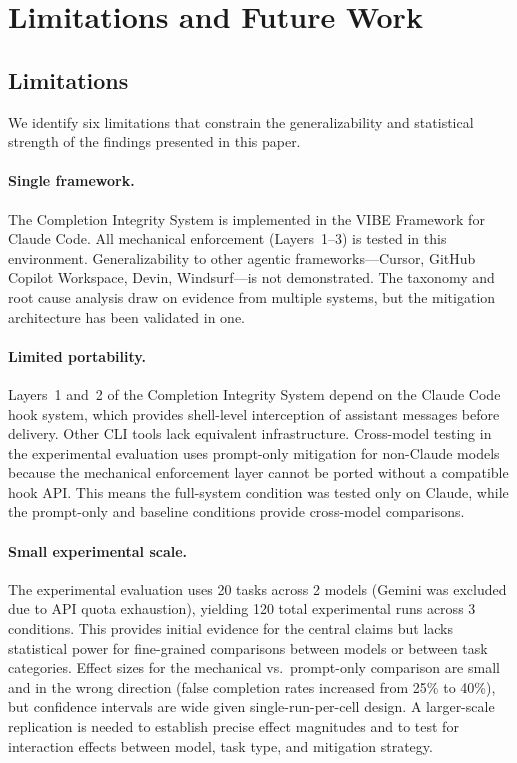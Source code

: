 \section{Limitations and Future Work}
\label{sec:limitations}


\subsection{Limitations}
\label{sec:limits}

We identify six limitations that constrain the generalizability and statistical strength of the findings presented in this paper.

\paragraph{Single framework.}
The Completion Integrity System is implemented in the VIBE Framework for Claude Code.
All mechanical enforcement (Layers~1--3) is tested in this environment.
Generalizability to other agentic frameworks---Cursor, GitHub Copilot Workspace, Devin, Windsurf---is not demonstrated.
The taxonomy and root cause analysis draw on evidence from multiple systems, but the mitigation architecture has been validated in one.

\paragraph{Limited portability.}
Layers~1 and~2 of the Completion Integrity System depend on the Claude Code hook system, which provides shell-level interception of assistant messages before delivery.
Other CLI tools lack equivalent infrastructure.
Cross-model testing in the experimental evaluation uses prompt-only mitigation for non-Claude models because the mechanical enforcement layer cannot be ported without a compatible hook API.
This means the full-system condition was tested only on Claude, while the prompt-only and baseline conditions provide cross-model comparisons.

\paragraph{Small experimental scale.}
The experimental evaluation uses 20 tasks across 2 models (Gemini was excluded due to API quota exhaustion), yielding 120 total experimental runs across 3 conditions.
This provides initial evidence for the central claims but lacks statistical power for fine-grained comparisons between models or between task categories.
Effect sizes for the mechanical vs.\ prompt-only comparison are small and in the wrong direction (false completion rates increased from 25\% to 40\%), but confidence intervals are wide given single-run-per-cell design.
A larger-scale replication is needed to establish precise effect magnitudes and to test for interaction effects between model, task type, and mitigation strategy.

